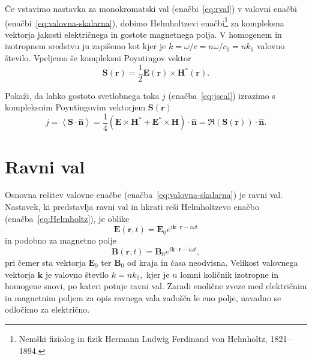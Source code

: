 Če vstavimo nastavka za monokromatski val (enačbi~\ref{eq:rval}) v valovni enačbi
(enačbi~\ref{eq:valovna-skalarna}), dobimo Helmholtzevi
enačbi\footnote{Nemški fiziolog in fizik Hermann Ludwig Ferdinand von Helmholtz, 1821--1894.} 
za kompleksna vektorja jakosti električnega in gostote magnetnega polja.
V homogenem in izotropnem sredstvu ju zapišemo kot
kjer je $k=\omega/c = n \omega/c_0 = n k_0$ valovno število. 
Vpeljemo še kompleksni Poyntingov vektor
\begin{equation}
\mathbf{S}(\mathbf{r})=\frac{1}{2}\mathbf{E}(\mathbf{r})\times\mathbf{H}^{*}(\mathbf{r}).
\label{eq:Poyntingov-vektor-c}
\end{equation}
\begin{definition}
Pokaži, da lahko gostoto svetlobnega toka $j$ (enačba~\ref{eq:jscal}) izrazimo
s kom\-plek\-snim Poyntingovim vektorjem $\mathbf{S}(\mathbf{r})$
\begin{equation}
\label{eq:jReS}
j=\left\langle \mathbf{\mathbf{S}}\cdot\mathbf{\hat{n}}\right\rangle =
\frac{1}{4}\left(\mathbf{E}\times\mathbf{H}^{*}+\mathbf{E}^{*}\times\mathbf{H}\right)\cdot\mathbf{\hat{n}}=\Re(\mathbf{S}
(\mathbf{r}))\cdot\mathbf{\hat{n}}.
\end{equation}
\end{definition}

\section{Ravni val}
Osnovna rešitev valovne enačbe (enačba~\ref{eq:valovna-skalarna}) je ravni 
val. Nastavek, ki predstavlja ravni val in hkrati reši 
Helmholtzevo enačbo (enačba~\ref{eq:Helmholtz}), je oblike
\begin{equation}
\mathbf{E}(\mathbf{r},t) =
\mathbf{E}_{0}e^{i\mathbf{k}\cdot\mathbf{r}-i \omega t}
\end{equation}
in podobno za magnetno polje
\begin{equation}
 \mathbf{B}(\mathbf{r},t) =
\mathbf{B}_{0}e^{i\mathbf{k}\cdot\mathbf{r}-i \omega t},
\end{equation}
pri čemer sta vektorja $\mathbf{E}_{0}$ ter $\mathbf{B}_{0}$ od kraja in časa neodvisna. 
Velikost valovnega vektorja $\mathbf{k}$ je valovno število $k=nk_{0},$ 
kjer je $n$ lomni količnik izotropne in homogene snovi, po kateri potuje ravni val.
Zaradi enolične zveze med električnim in magnetnim poljem 
za opis ravnega vala zadošča le eno polje, navadno se odločimo za električno.

